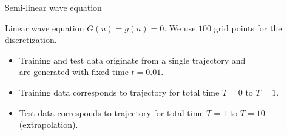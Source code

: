 \begin{frame}[c]{Semi-linear wave equation}
  \centering
\end{frame}

\begin{frame}[c]{Linear wave equation}
  $G(u) = g(u) =0$. We use $100$ grid points for the discretization.

  \vspace{0.3cm}
  \begin{itemize}
    \item Training and test data originate from a single trajectory and\\
    are generated with fixed time $t = 0.01$.
    \item Training data corresponds to trajectory for total time $T=0$ to $T=1$.
    \item Test data corresponds to trajectory for total time $T=1$ to $T=10$ (extrapolation).
  \end{itemize}
  
\end{frame}

